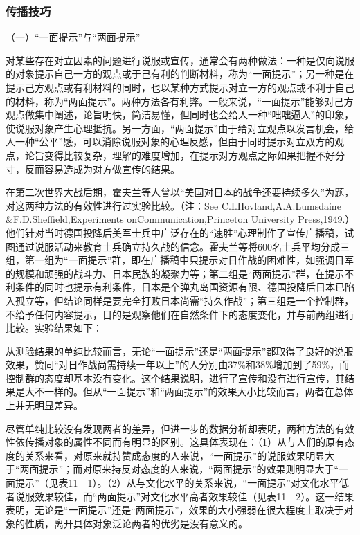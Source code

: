 \documentclass[UTF8,12pt]{ctexart}
\numberwithin{equation}{section} %
\numberwithin{figure}{section}
\numberwithin{table}{section}
\begin{document}
	\subsubsection{传播技巧}
	
	（一）“一面提示”与“两面提示”
	
	对某些存在对立因素的问题进行说服或宣传，通常会有两种做法：一种是仅向说服的对象提示自己一方的观点或于己有利的判断材料，称为“一面提示”；另一种是在提示己方观点或有利材料的同时，也以某种方式提示对立一方的观点或不利于自己的材料，称为“两面提示”。两种方法各有利弊。一般来说，“一面提示”能够对己方观点做集中阐述，论旨明快，简洁易懂，但同时也会给人一种“咄咄逼人”的印象，使说服对象产生心理抵抗。另一方面，“两面提示”由于给对立观点以发言机会，给人一种“公平”感，可以消除说服对象的心理反感，但由于同时提示对立双方的观点，论旨变得比较复杂，理解的难度增加，在提示对方观点之际如果把握不好分寸，反而容易造成为对方做宣传的结果。
	
	在第二次世界大战后期，霍夫兰等人曾以“美国对日本的战争还要持续多久”为题，对这两种方法的有效性进行过实验比较。（注：See C.I.Hovland,A.A.Lumsdaine \&F.D.Sheffield,Experiments onCommunication,Princeton University Press,1949.）他们针对当时德国投降后美军士兵中广泛存在的“速胜”心理制作了宣传广播稿，试图通过说服活动来教育士兵确立持久战的信念。霍夫兰等将600名士兵平均分成三组，第一组为“一面提示”群，即在广播稿中只提示对日作战的困难性，如强调日军的规模和顽强的战斗力、日本民族的凝聚力等；第二组是“两面提示”群，在提示不利条件的同时也提示有利条件，日本是个弹丸岛国资源有限、德国投降后日本已陷入孤立等，但结论同样是要完全打败日本尚需“持久作战”；第三组是一个控制群，不给予任何内容提示，目的是观察他们在自然条件下的态度变化，并与前两组进行比较。实验结果如下：
	
	从测验结果的单纯比较而言，无论“一面提示”还是“两面提示”都取得了良好的说服效果，赞同“对日作战尚需持续一年以上”的人分别由37\%和38\%增加到了59\%，而控制群的态度却基本没有变化。这个结果说明，进行了宣传和没有进行宣传，其结果是大不一样的。但从“一面提示”和“两面提示”的效果大小比较而言，两者在总体上并无明显差异。
	
	尽管单纯比较没有发现两者的差异，但进一步的数据分析却表明，两种方法的有效性依传播对象的属性不同而有明显的区别。这具体表现在：（1）从与人们的原有态度的关系来看，对原来就持赞成态度的人来说，“一面提示”的说服效果明显大于“两面提示”；而对原来持反对态度的人来说，“两面提示”的效果则明显大于“一面提示”（见表11—1）。（2）从与文化水平的关系来说，“一面提示”对文化水平低者说服效果较佳，而“两面提示”对文化水平高者效果较佳（见表11—2）。这一结果表明，无论是“一面提示”还是“两面提示”，效果的大小强弱在很大程度上取决于对象的性质，离开具体对象泛论两者的优劣是没有意义的。
	
\end{document}
